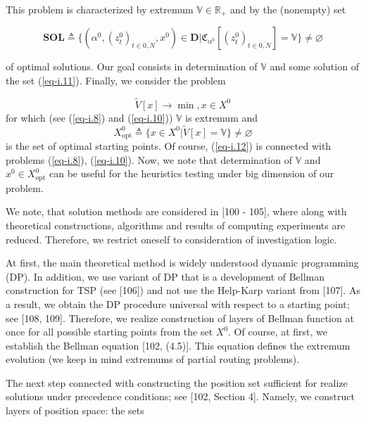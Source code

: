 \documentclass{article}
\begin{document}
This problem is characterized by extremum
$\mathbb V \in \mathbb R_+$
and by the (nonempty) set

\begin{equation}
  \label{eq-i.11}
  \mathbf{SOL}
  \triangleq
  \{
    (\alpha^0, (z_t^0)_{t \in \overline{0,N}}, x^0) \in \mathbf D
  |
    \mathfrak C_{\alpha^0}[(z_t^0)_{t \in \overline{0,N}}] = \mathbb V
  \}
  \neq \varnothing
\end{equation}

of optimal solutions.
Our goal consists in determination of
$\mathbb V$
and some solution of the set (\ref{eq-i.11}).
Finally, we consider the problem

\begin{equation}
  \label{eq-i.12}
  \tilde{V}[x] \to \min,
  x \in X^0
\end{equation}
for which
(see (\ref{eq-i.8}) and (\ref{eq-i.10}))
$\mathbb V$
is extremum and
\begin{equation*}
  X^0_{\mathrm{opt}}
  \triangleq
  \{
    x \in X^0
  |
    \tilde{V}[x] = \mathbb V
  \}
  \neq \varnothing
\end{equation*}
is the set of optimal starting points.
Of course,
(\ref{eq-i.12})
is connected with problems
(\ref{eq-i.8}), (\ref{eq-i.10}).
Now, we note that determination of
$\mathbb V$
and
$x^0 \in X^0_{\mathrm{opt}}$
can be useful for the heuristics testing
under big dimension of our problem.

We note, that solution methods are considered in
[100 - 105],       %
where along with theoretical constructions,
algorithms and results of computing experiments are reduced.
Therefore,
we restrict oneself to consideration of investigation logic.

At first,
the main theoretical method is widely understood dynamic programming
(DP).
In addition,
we use variant of DP that is a development of Bellman
construction for TSP
(see [106])   %
and not use the Help-Karp variant from
[107].        %
As a result,
we obtain the DP procedure universal with respect to
a starting point; see
[108, 109].   %
Therefore,
we realize construction of layers of Bellman function at once
for all possible starting points from the set
$X^0$.
Of course,
at first,
we establish the Bellman equation
[102, (4.5)].  %
This equation defines the extremum evolution
(we keep in mind extremums of partial routing problems).

The next step connected with constructing the position set
sufficient for realize solutions
under precedence conditions;
see
[102, Section 4].  %
Namely,
we construct layers of position space:
the sets
\end{document}
